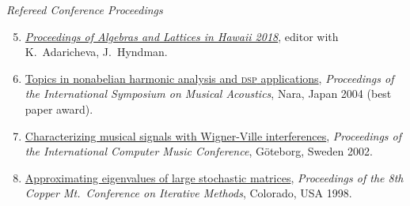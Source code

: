    {\it Refereed Conference Proceedings}\\[-6pt]
    \begin{enumerate}
      \setcounter{enumi}{4}

     \item \href{http://www.lulu.com/shop/kira-adaricheva-and-william-demeo-and-jennifer-hyndman/algebras-and-lattices-in-hawaii-honoring-ralph-freese-bill-lampe-and-jb-nation/paperback/product-23634583.html}{\it Proceedings of Algebras and Lattices in Hawaii 2018}, editor with K.~Adaricheva, J.~Hyndman.

    \item \href{https://github.com/williamdemeo/ISMA2004/raw/master/DeMeo-ISMA2004-FinalPaper.pdf}%
           {Topics in nonabelian harmonic analysis and \textsc{dsp}  applications},
      {\it Proceedings of the International Symposium on Musical Acoustics}, Nara, Japan 2004
      (best paper award).

    \item \href{https://github.com/williamdemeo/ICMC2002/raw/master/DeMeo-ICMC2002.pdf}%
           {Characterizing musical signals with Wigner-Ville interferences},
      {\it Proceedings of the International Computer Music Conference}, G\"{o}teborg, Sweden 2002.

     \item \href{https://williamdemeo.github.io/MSThesis}%
           {Approximating eigenvalues of large stochastic matrices},
      {\it Proceedings of the 8th Copper Mt.~Conference on Iterative Methods},
      Colorado, USA 1998.
    \end{enumerate}

\newpage

~\vspace{-14mm}


